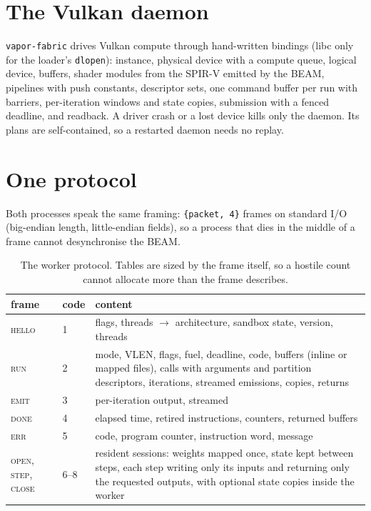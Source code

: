 \section{The Vulkan daemon}

\texttt{vapor-fabric} drives Vulkan compute through hand-written bindings (libc only for the loader's
\texttt{dlopen}): instance, physical device with a compute queue, logical device, buffers, shader modules
from the SPIR-V emitted by the BEAM, pipelines with push constants, descriptor sets, one command buffer
per run with barriers, per-iteration windows and state copies, submission with a fenced deadline, and
readback. A driver crash or a lost device kills only the daemon. Its plans are self-contained, so a
restarted daemon needs no replay.

\section{One protocol}

Both processes speak the same framing: \texttt{\{packet, 4\}} frames on standard I/O (big-endian
length, little-endian fields), so a process that dies in the middle of a frame cannot desynchronise the
BEAM.

\begin{table}[h]
\centering\small
\begin{tabularx}{\textwidth}{@{}llX@{}}
\toprule
frame & code & content \\
\midrule
\textsc{hello} & 1 & flags, threads $\to$ architecture, sandbox state, version, threads \\
\textsc{run} & 2 & mode, VLEN, flags, fuel, deadline, code, buffers (inline or mapped files), calls with arguments and partition descriptors, iterations, streamed emissions, copies, returns \\
\textsc{emit} & 3 & per-iteration output, streamed \\
\textsc{done} & 4 & elapsed time, retired instructions, counters, returned buffers \\
\textsc{err} & 5 & code, program counter, instruction word, message \\
\textsc{open}, \textsc{step}, \textsc{close} & 6--8 & resident sessions: weights mapped once, state kept between steps, each step writing only its inputs and returning only the requested outputs, with optional state copies inside the worker \\
\bottomrule
\end{tabularx}
\caption{The worker protocol. Tables are sized by the frame itself, so a hostile count cannot allocate
more than the frame describes.}
\end{table}

